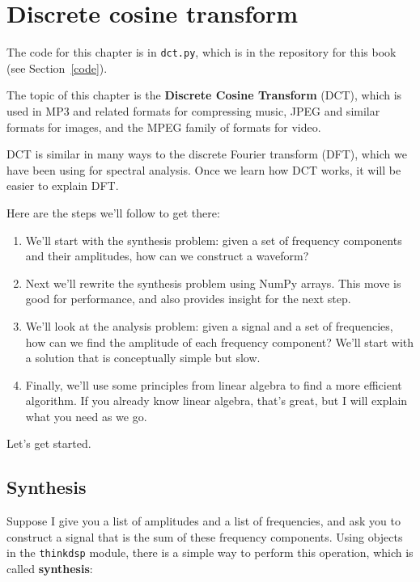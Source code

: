 \documentclass[12pt]{book}
\begin{document}
\chapter{Discrete cosine transform}
\label{dct}

The code for this chapter is in {\tt dct.py}, which is in the
repository for this book (see Section~\ref{code}).

The topic of this chapter is the {\bf Discrete Cosine
  Transform} (DCT), which is used in MP3 and related formats for
compressing music, JPEG and similar formats for images, and the MPEG
family of formats for video.

DCT is similar in many ways to the discrete Fourier transform (DFT),
which we have been using for spectral analysis.
Once we learn how DCT works, it will be easier to explain DFT.

Here are the steps we'll follow to get there:

\begin{enumerate}

\item We'll start with the synthesis problem: given a set of frequency
  components and their amplitudes, how can we construct a waveform?

\item Next we'll rewrite the synthesis problem using NumPy arrays.
  This move is good for performance, and also provides insight
  for the next step.

\item We'll look at the analysis problem: given a signal and a
  set of frequencies, how can we find the amplitude of each frequency
  component?  We'll start with a solution that is conceptually simple
  but slow.

\item Finally, we'll use some principles from linear algebra to find a
  more efficient algorithm.  If you already know linear algebra,
  that's great, but I will explain what you need as we go.

\end{enumerate}

Let's get started.


\section{Synthesis}
\label{synth1}

Suppose I give you a list of amplitudes and a list of frequencies,
and ask you to construct a signal that is the sum of these frequency
components.  Using objects in the {\tt thinkdsp} module, there is
a simple way to perform this operation, which is called {\bf synthesis}:
\end{document}

